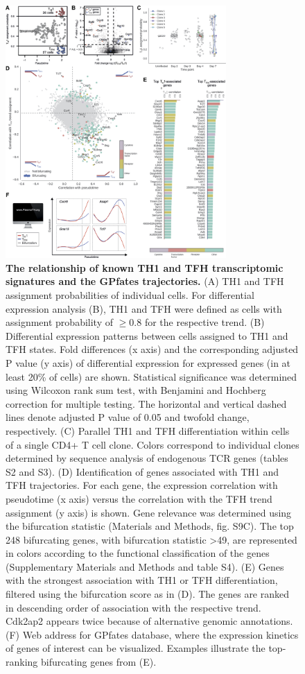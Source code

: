 \begin{figure}
    \centering
    \includegraphics[width=0.75\textwidth]{"Fig3"}
    \caption[The relationship of known TH1 and TFH transcriptomic signatures and the GPfates trajectories]{\textbf{The relationship of known TH1 and TFH transcriptomic signatures and the GPfates trajectories.} (A) TH1 and TFH assignment probabilities of individual cells. For differential expression analysis (B), TH1 and TFH were defined as cells with assignment probability of \( \geq 0.8 \) for the respective trend. (B) Differential expression patterns between cells assigned to TH1 and TFH states. Fold differences (x axis) and the corresponding adjusted P value (y axis) of differential expression for expressed genes (in at least 20\% of cells) are shown. Statistical significance was determined using Wilcoxon rank sum test, with Benjamini and Hochberg correction for multiple testing. The horizontal and vertical dashed lines denote adjusted P value of 0.05 and twofold change, respectively. (C) Parallel TH1 and TFH differentiation within cells of a single CD4+ T cell clone. Colors correspond to individual clones determined by sequence analysis of endogenous TCR genes (tables S2 and S3). (D) Identification of genes associated with TH1 and TFH trajectories. For each gene, the expression correlation with pseudotime (x axis) versus the correlation with the TFH trend assignment (y axis) is shown. Gene relevance was determined using the bifurcation statistic (Materials and Methods, fig. S9C). The top 248 bifurcating genes, with bifurcation statistic >49, are represented in colors according to the functional classification of the genes (Supplementary Materials and Methods and table S4). (E) Genes with the strongest association with TH1 or TFH differentiation, filtered using the bifurcation score as in (D). The genes are ranked in descending order of association with the respective trend. Cdk2ap2 appears twice because of alternative genomic annotations. (F) Web address for GPfates database, where the expression kinetics of genes of interest can be visualized. Examples illustrate the top-ranking bifurcating genes from (E).}
    \label{fig:bifurcating}
\end{figure}


